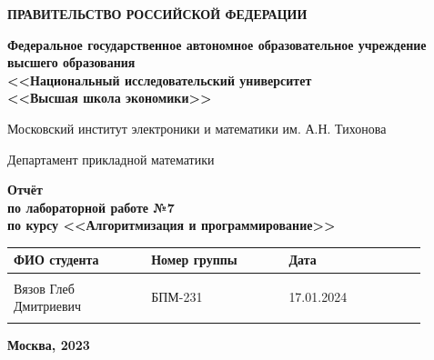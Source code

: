 \documentclass[12pt]{article}
\begin{document}
\thispagestyle{empty}
\begin{center}
\textbf{ПРАВИТЕЛЬСТВО РОССИЙСКОЙ ФЕДЕРАЦИИ}

\vspace{5ex}
	
\textbf{Федеральное государственное автономное образовательное учреждение \\ высшего образования \\ <<Национальный исследовательский университет \\ <<Высшая школа экономики>>}
\end{center}
\vspace{5ex}

\begin{center}
    Московский институт электроники и математики им. А.Н. Тихонова  
    
    \vspace{5ex}
    
    Департамент прикладной математики
    
    \vspace{10ex}
    \textbf{Отчёт \\ по лабораторной работе №7 \\ по курсу <<Алгоритмизация и программирование>>}
	\vspace{7ex}

\end{center}

\begin{center} 
\begin{tabular}{| p{0.3\linewidth}| p{0.3\linewidth}| p{0.3\linewidth}|}
 \hline	
ФИО студента & Номер группы & Дата \\  \hline
 & & \\  
Вязов Глеб \newline Дмитриевич & БПМ-231 & 17.01.2024\\  
 & & \\  \hline		
\end{tabular}
\end{center}

\begin{center}
	\vspace{3ex}
	
	\vfill
   
   \normalsize
    
	\textbf{Москва, 2023}
\end{center}

\newpage

\end{document}
